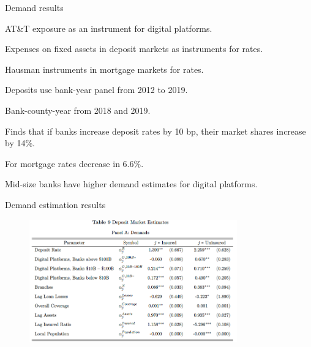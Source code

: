 \documentclass[notes,10pt, aspectratio=169]{beamer}
\newenvironment{wideitemize}{\itemize\addtolength{\itemsep}{10pt}}{\enditemize}
\begin{document}
        \begin{frame}{Demand results}\label{der_impact}
            \begin{wideitemize}
                \item AT\&T exposure as an instrument for digital platforms.
                \item Expenses on fixed assets in deposit markets as instruments for rates.
                \item Hausman instruments in mortgage markets for rates.
                
            \item Deposits use bank-year panel from 2012 to 2019. 
            \item Bank-county-year from 2018 and 2019. 
            
            \item Finds that if banks increase deposit rates by 10 bp, their market shares increase by 14\%.
            \item For mortgage rates decrease in 6.6\%.
            \item Mid-size banks have higher demand estimates for digital platforms.
   
                
            \end{wideitemize}

              
    \end{frame}
    

\begin{frame}{Demand estimation results}\label{demand_results1}


    \begin{figure}
        \centering
        \includegraphics[width=0.8\textwidth]{imgs/tab9.png}
    \end{figure}
    
    \end{frame}
\end{document}
